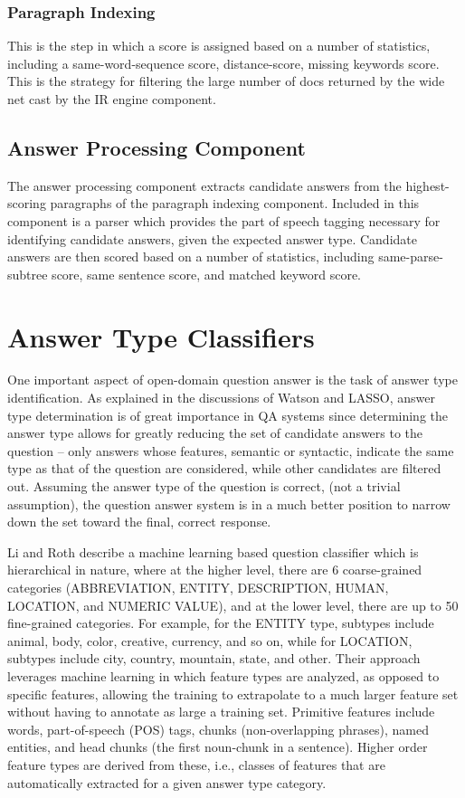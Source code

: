 \subsubsection{Paragraph Indexing}

This is the step in which a score is assigned based on a number of statistics, including a same-word-sequence score, distance-score, missing keywords score.  This is the strategy for filtering the large number of docs returned by the wide net cast by the IR engine component.

\subsection{Answer Processing Component}

The answer processing component extracts candidate answers from the highest-scoring paragraphs of the paragraph indexing component.  Included in this component is a parser which provides the part of speech tagging necessary for identifying candidate answers, given the expected answer type.  Candidate answers are then scored based on a number of statistics, including same-parse-subtree score, same sentence score, and matched keyword score.


\section{Answer Type Classifiers}

One important aspect of open-domain question answer is the task of answer type identification.  As explained in the discussions of Watson and LASSO, answer type determination is of great importance in QA systems since determining the answer type allows for greatly reducing the set of candidate answers to the question – only answers whose features, semantic or syntactic, indicate the same type as that of the question are considered, while other candidates are filtered out.  Assuming the answer type of the question is correct, (not a trivial assumption), the question answer system is in a much better position to narrow down the set toward the final, correct response.

Li and Roth \cite{li2002learning} describe a machine learning based question classifier which is hierarchical in nature, where at the higher level, there are 6 coarse-grained categories (ABBREVIATION, ENTITY, DESCRIPTION, HUMAN, LOCATION, and NUMERIC VALUE), and at the lower level, there are up to 50 fine-grained categories.  For example, for the ENTITY type, subtypes include animal, body, color, creative, currency, and so on, while for LOCATION, subtypes include city, country, mountain, state, and other.  Their approach leverages machine learning in which feature types are analyzed, as opposed to specific features, allowing the training to extrapolate to a much larger feature set without having to annotate as large a training set.  Primitive features include words, part-of-speech (POS) tags, chunks (non-overlapping phrases),  named entities, and head chunks (the first noun-chunk in a sentence).   Higher order feature types are derived from these, i.e., classes of features that are automatically extracted for a given answer type category. 


